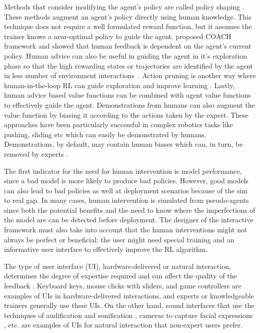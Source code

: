 \documentclass[twoside,11pt]{article}
\begin{document}
Methods that consider modifying the agent's policy are called policy shaping \citep{griffith2013policy,cederborg2015policy,WuEtAl:2021:HITLDRLAutonomousDriving}. These methods augment an agent's policy directly using human knowledge. This technique does not require a well formulated reward function, but it assumes the trainer knows a near-optimal policy to guide the agent. \cite{macglashan2017interactive} proposed COACH framework and showed that human feedback is dependent on the agent’s current policy. Human advice can also be useful in guiding the agent in it’s exploration phase so that the high rewarding states or trajectories are identified by the agent in less number of environment interactions~\citep{amir2016interactive}. Action pruning is another way where human-in-the-loop RL can guide exploration and improve learning \citep{Abel:2017:AgentAgnosticHumanInTheLoopRL}.
  Lastly, human advice based value functions can be combined with agent value functions~\citep{taylor2011integrating, kartoun:10,jiang:21, wu:21} to effectively guide the agent. Demonstrations \citep{hester2018deep,vecerik2017leveraging,nair2018overcoming} from humans can also augment the value function by biasing it according to the  actions taken by the expert. These approaches have been particularly successful in complex robotics tasks like pushing, sliding etc which can easily be demonstrated by humans.  Demonstrations, by default, may contain human biases which can, in turn, be removed by experts \citep{Wang:2022:SkillPreferences}.

The first indicator for the need for human intervention is model performance, since a bad model is more likely to produce bad policies. However, good models can also lead to bad policies as well at deployment scenarios because of the sim to real gap. In many cases, human intervention is simulated from pseudo-agents since both the potential benefits and the need to know where the imperfections of the model are can be detected before deployment. The designer of the interactive framework must also take into account that the human interventions might not always be perfect or beneficial; the user might need special training and an informative user interface to effectively improve the RL algorithm. 

The type of user interface (UI), hardware-delivered or natural interaction,  determines the degree of expertise required and can affect the quality of the feedback \citep{lin:20}. Keyboard keys, mouse clicks with sliders, and game controllers are examples of UIs in hardware-delivered interactions, and experts or knowledgeable trainers generally use these UIs. On the other hand, sound interfaces that use the techniques of audification and sonification \citep{Hermann:2011:Sonification, Saranti:2009:QuantumHarmonicOscSonification,kartoun:10,Scurto:2021:DesigningDeepRLHumanParameterExploration}, cameras to capture facial expressions \citep{arakawa:18}, etc. are examples of UIs for natural interaction that non-expert users prefer. 
\end{document}
